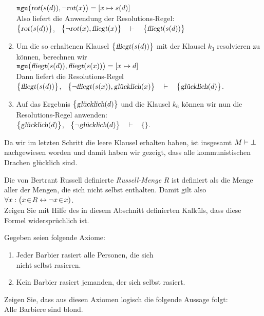 \begin{enumerate}
      $\mathtt{mgu}\bigl(\textsl{rot}(s(d)), \neg \textsl{rot}(x)\bigr) = [x \mapsto s(d)]$
      \\[0.2cm]
      Also liefert die Anwendung der Resolutions-Regel:
      \\[0.2cm]
      \hspace*{1.3cm}
      $\bigl\{\textsl{rot}(s(d))\bigl\}$, \ $\bigl\{\neg \textsl{rot}(x), \textsl{fliegt}(x)\bigl\}$ \ $\vdash$ \ $\bigl\{\textsl{fliegt}(s(d))\bigl\}$
\item Um die so erhaltenen Klausel $\bigl\{\textsl{fliegt}(s(d))\bigl\}$ mit der Klausel
      $k_3$ resolvieren zu k\"{o}nnen, berechnen wir
      \\[0.2cm]
      \hspace*{1.3cm}
      $\mathtt{mgu}\bigl(\textsl{fliegt}(s(d)), \textsl{fliegt}(s(x))\bigr) = [x \mapsto d]$
      \\[0.2cm]
      Dann liefert die Resolutions-Regel
      \\[0.2cm]
      \hspace*{1.3cm}
      $\bigl\{\textsl{fliegt}(s(d))\bigl\}$, \ $\bigl\{\neg \textsl{fliegt}(s(x)), \textsl{gl\"{u}cklich}(x)\bigl\}$ \ $\vdash$ \ $\bigl\{\textsl{gl\"{u}cklich}(d)\bigl\}$.
\item Auf das Ergebnis $\bigl\{\textsl{gl\"{u}cklich}(d)\bigl\}$ und die Klausel $k_6$ k\"{o}nnen
      wir nun die Resolutions-Regel anwenden:
      \\[0.2cm]
      \hspace*{1.3cm}
      $\bigl\{\textsl{gl\"{u}cklich}(d)\bigl\}$, \  $\bigl\{\neg \textsl{gl\"{u}cklich}(d)\bigl\}$ \ $\vdash$ \ $\bigl\{\bigl\}$.
\end{enumerate}
Da wir im letzten Schritt die leere Klausel erhalten haben,  ist insgesamt $M \vdash
\bot$ 
nachgewiesen worden und damit haben wir gezeigt, dass alle kommunistischen Drachen gl\"{u}cklich sind. 
\eox

\exercise
Die von Bertrant Russell definierte \emph{Russell-Menge} $R$ ist
definiert als die Menge aller der Mengen, die sich nicht selbst enthalten.   Damit gilt also
\\[0.2cm]
\hspace*{1.3cm}
$\forall x: \bigl( x \!\in\! R \leftrightarrow \neg x \!\in\! x)$.
\\[0.2cm]
Zeigen Sie mit Hilfe des in diesem Abschnitt definierten Kalk\"{u}ls, dass diese Formel
widerspr\"{u}chlich ist. 
\vspace{0.3cm}

\exercise
Gegeben seien folgende Axiome:
\begin{enumerate}
\item Jeder Barbier rasiert alle Personen, die sich\\ nicht selbst rasieren.
\item Kein Barbier rasiert jemanden, der sich selbst rasiert.
\end{enumerate}
Zeigen Sie, dass aus diesen Axiomen logisch die folgende Aussage folgt: \\[0.3cm]
\hspace*{1.3cm} Alle Barbiere sind blond.

